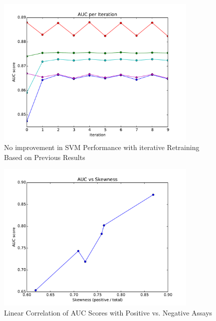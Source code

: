 \documentclass[journal]{IEEEtran}
\begin{document}
\begin{figure}[!h]
\centering
\includegraphics[width=3.8in]{iterations}
\caption{No improvement in SVM Performance with iterative Retraining Based on Previous Results}
\label{fig_sim}
\end{figure}

\begin{figure}[!h]
\centering
\includegraphics[width=3.8in]{skew_v_auc}
\caption{Linear Correlation of AUC Scores with Positive vs. Negative Assays}
\label{fig_sim}
\end{figure}
\end{document}
